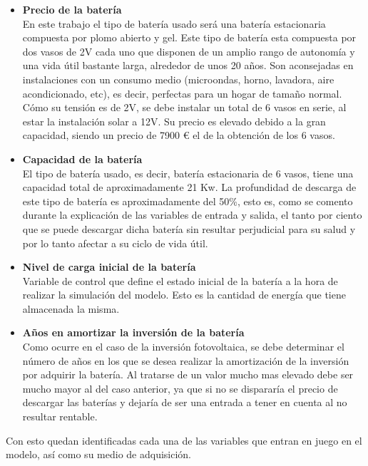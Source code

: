\begin{itemize}
	\item \textbf{Precio de la batería}\\ En este trabajo el tipo de batería usado será una batería estacionaria compuesta por plomo abierto y gel. Este tipo de batería esta compuesta por dos vasos de 2V cada uno que disponen de un amplio rango de autonomía y una vida útil bastante larga, alrededor de unos 20 años. Son aconsejadas en instalaciones con un consumo medio (microondas, horno, lavadora, aire acondicionado, etc), es decir, perfectas para un hogar de tamaño normal. Cómo su tensión es de 2V, se debe instalar un total de 6 vasos en serie, al estar la instalación solar a 12V. Su precio es elevado debido a la gran capacidad, siendo un precio de 7900 € el de la obtención de los 6 vasos.
	\item \textbf{Capacidad de la batería}\\ El tipo de batería usado, es decir, batería estacionaria de 6 vasos, tiene una capacidad total de aproximadamente 21 Kw. La profundidad de descarga de este tipo de batería es aproximadamente del 50\%, esto es, como se comento durante la explicación de las variables de entrada y salida, el tanto por ciento que se puede descargar dicha batería sin resultar perjudicial para su salud y por lo tanto afectar a su ciclo de vida útil.
	\item \textbf{Nivel de carga inicial de la batería}\\ Variable de control que define el estado inicial de la batería a la hora de realizar la simulación del modelo. Esto es la cantidad de energía que tiene almacenada la misma.
	\item \textbf{Años en amortizar la inversión de la batería}\\ Como ocurre en el caso de la inversión fotovoltaica, se debe determinar el número de años en los que se desea realizar la amortización de la inversión por adquirir la batería. Al tratarse de un valor mucho mas elevado debe ser mucho mayor al del caso anterior, ya que si no se dispararía el precio de descargar las baterías y dejaría de ser una entrada a tener en cuenta al no resultar rentable.
\end{itemize}
Con esto quedan identificadas cada una de las variables que entran en juego en el modelo, así como su medio de adquisición.